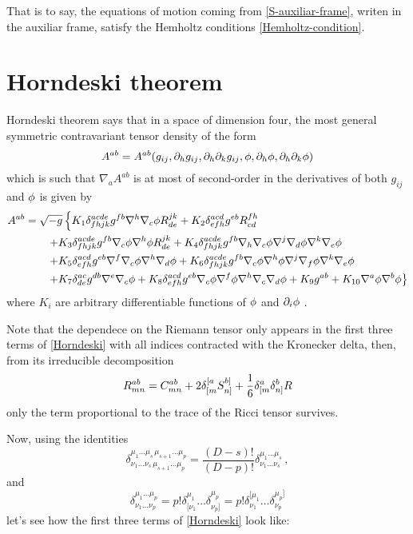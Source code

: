 That is to say, the equations of motion coming from \eqref{S-auxiliar-frame}, writen in the auxiliar frame, satisfy the Hemholtz conditions \eqref{Hemholtz-condition}.


\section{Horndeski theorem}
Horndeski theorem says that in a space of dimension four, the most general symmetric contravariant tensor density of the form
\begin{equation}
  A^{ab}=A^{ab}(g_{ij},\partial_hg_{ij},\partial_{h}\partial_k g_{ij},\phi,\partial_h\phi,\partial_h\partial_k\phi )
\end{equation}
which is such that $\nabla_aA^{ab }$ is at most of second-order in the derivatives of both $g_{ij}$ and $\phi$ is given by
\begin{equation}\label{Horndeski}
\begin{split}
  A^{ab}&=\sqrt{-g}\left\{K_1\delta^{acde}_{fhjk}g^{fb}\nabla^h\nabla_c\phi R^{jk}_{de}+K_2\delta^{acd}_{efh}g^{eb}R^{fh}_{cd}\right.\\
  &\left.\qquad +K_3\delta^{acde}_{fhjk}g^{fb}\nabla_c\phi\nabla^h\phi R^{jk}_{de}+K_4\delta^{acde}_{fhjk}g^{fb}\nabla_h\nabla_c\phi \nabla^j\nabla_d\phi \nabla^k\nabla_e\phi \right.\\
  &\left.\qquad +K_5\delta^{acd}_{efh}g^{eb}\nabla^f\nabla_c\phi \nabla^h\nabla_d\phi +K_6\delta^{acde}_{fhjk}g^{fb}\nabla_c\phi \nabla^h\phi \nabla^j\nabla_f\phi \nabla^k\nabla_e\phi \right.\\
  &\left.\qquad +K_7\delta^{ac}_{de}g^{db}\nabla^{e}\nabla_c\phi+K_8\delta^{acd}_{efh}g^{eb}\nabla_c\phi \nabla^f\phi \nabla^h\nabla_c\nabla_d\phi +K_9g^{ab}+K_{10}\nabla^{a}\phi\nabla^b\phi  \right\}
\end{split}
\end{equation}
where $K_i $ are arbitrary differentiable functions of $\phi$ and $\partial_i\phi$ \cite{Horndeski:1974wa}.

Note that the dependece on the Riemann tensor only appears in the first three terms of \eqref{Horndeski} with all indices contracted with the Kronecker delta, then, from its irreducible decomposition
\begin{equation}\label{R-CSR}
  R^{ab}_{mn}=C^{ab}_{mn}+2\delta^{[a}_{[m}S^{b]}_{n]}+\frac{1}{6}\delta^{a}_{[m}\delta^b_{n]}R
\end{equation}
 only the term proportional to the trace of the Ricci tensor survives.
 
 Now, using the identities
\begin{equation}
{\displaystyle \delta _{\nu _{1}\dots \nu _{s}\,\mu _{s+1}\dots \mu _{p}}^{\mu _{1}\dots \mu _{s}\,\mu _{s+1}\dots \mu _{p}}={\frac {(D-s)!}{(D-p)!}}\delta _{\nu _{1}\dots \nu _{s}}^{\mu _{1}\dots \mu _{s}}}\,,
\end{equation}
and
\begin{equation}
  {\displaystyle \delta _{\nu _{1}\dots \nu _{p}}^{\mu _{1}\dots \mu _{p}}=p!\delta _{[\nu _{1}}^{\mu _{1}}\dots \delta _{\nu _{p}]}^{\mu _{p}}=p!\delta _{\nu _{1}}^{[\mu _{1}}\dots \delta _{\nu _{p}}^{\mu _{p}]}}
\end{equation}
 let's see how the first three terms of \eqref{Horndeski} look like:
 
